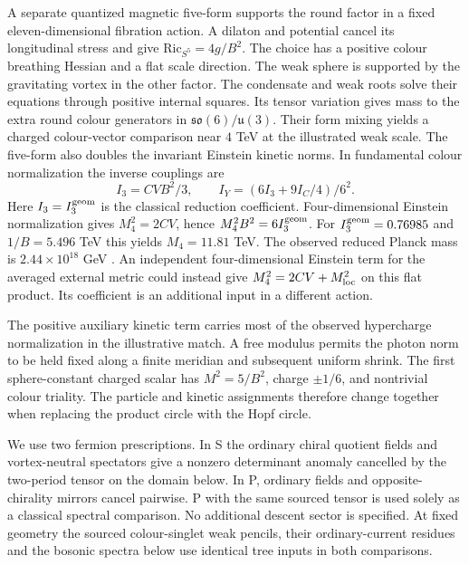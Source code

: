 \documentclass[aps,prd,reprint,onecolumn,nofootinbib,amsmath,amssymb]{revtex4-2}
\begin{document}
A separate quantized magnetic five-form supports the round factor in a fixed eleven-dimensional fibration action. A dilaton and potential cancel its longitudinal stress and give $\mathrm{Ric}_{S^5}=4g/B^2$. The choice has a positive colour breathing Hessian and a flat scale direction. The weak sphere is supported by the gravitating vortex in the other factor. The condensate and weak roots solve their equations through positive internal squares. Its tensor variation gives mass to the extra round colour generators in $\mathfrak{so}(6)/\mathfrak u(3)$. Their form mixing yields a charged colour-vector comparison near $4$ TeV at the illustrated weak scale. The five-form also doubles the invariant Einstein kinetic norms. In fundamental colour normalization the inverse couplings are
\begin{equation}
 I_3=CVB^2/3,\qquad I_Y=(6I_3+9I_C/4)/6^2 .
\end{equation}
Here $I_3=I_3^{\rm geom}$ is the classical reduction coefficient. Four-dimensional Einstein normalization gives $M_4^2=2CV$, hence $M_4^2B^2=6I_3^{\rm geom}$. For $I_3^{\rm geom}=0.76985$ and $1/B=5.496$ TeV this yields $M_4=11.81$ TeV. The observed reduced Planck mass is $2.44\times10^{18}$ GeV \cite{CODATA2022Adjustment}. An independent four-dimensional Einstein term for the averaged external metric could instead give $M_4^2=2CV+M_{\rm loc}^2$ on this flat product. Its coefficient is an additional input in a different action.

The positive auxiliary kinetic term carries most of the observed hypercharge normalization in the illustrative match. A free modulus permits the photon norm to be held fixed along a finite meridian and subsequent uniform shrink. The first sphere-constant charged scalar has $M^2=5/B^2$, charge $\pm1/6$, and nontrivial colour triality. The particle and kinetic assignments therefore change together when replacing the product circle with the Hopf circle.

We use two fermion prescriptions. In S the ordinary chiral quotient fields and vortex-neutral spectators give a nonzero determinant anomaly cancelled by the two-period tensor on the domain below. In P, ordinary fields and opposite-chirality mirrors cancel pairwise. P with the same sourced tensor is used solely as a classical spectral comparison. No additional descent sector is specified. At fixed geometry the sourced colour-singlet weak pencils, their ordinary-current residues and the bosonic spectra below use identical tree inputs in both comparisons.
\end{document}

